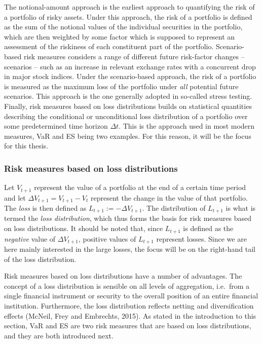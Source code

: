 \documentclass[a4paper,11pt]{article}
\theoremstyle{definition}
\theoremstyle{definition}
\theoremstyle{definition}
\theoremstyle{definition}
\theoremstyle{remark}
\begin{document}
The notional-amount approach is the earliest approach to quantifying the risk of a portfolio of risky assets. Under this approach, the risk of a portfolio is defined as the sum of the notional values of the individual securities in the portfolio, which are then weighted by some factor which is supposed to represent an assessment of the riskiness of each constituent part of the portfolio. Scenario-based risk measures considers a range of different future risk-factor changes -- scenarios -- such as an increase in relevant exchange rates with a concurrent drop in major stock indices. Under the scenario-based approach, the risk of a portfolio is measured as the maximum loss of the portfolio under \emph{all} potential future scenarios. This approach is the one generally adopted in so-called stress testing. Finally, risk measures based on loss distributions builds on statistical quantities describing the conditional or unconditional loss distribution of a portfolio over some predetermined time horizon \(\Delta t\). This is the approach used in most modern measures, VaR and ES being two examples. For this reason, it will be the focus for this thesis.

\hypertarget{risk-measures-based-on-loss-distributions}{%
\subsubsection{Risk measures based on loss distributions}\label{risk-measures-based-on-loss-distributions}}

Let \(V_{t+1}\) represent the value of a portfolio at the end of a certain time period and let \(\Delta V_{t+1} = V_{t+1} - V_t\) represent the change in the value of that portfolio. The \emph{loss} is then defined as \(L_{t+1} := -\Delta V_{t+1}\). The distribution of \(L_{t + 1}\) is what is termed the \emph{loss distribution}, which thus forms the basis for risk measures based on loss distributions. It should be noted that, since \(L_{t+1}\) is defined as the \emph{negative} value of \(\Delta V_{t+1}\), positive values of \(L_{t+1}\) represent losses. Since we are here mainly interested in the large losses, the focus will be on the right-hand tail of the loss distribution.

Risk measures based on loss distributions have a number of advantages. The concept of a loss distribution is sensible on all levels of aggregation, i.e.~from a single financial instrument or security to the overall position of an entire financial institution. Furthermore, the loss distribution reflects netting and diversification effects (McNeil, Frey and Embrechts, 2015). As stated in the introduction to this section, VaR and ES are two risk measures that are based on loss distributions, and they are both introduced next.
\end{document}
